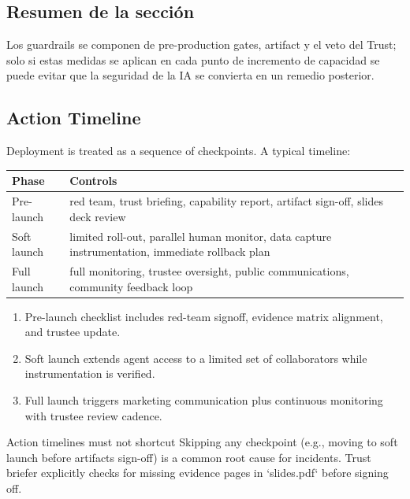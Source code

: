 \subsection{Resumen de la sección}

Los guardrails se componen de pre-production gates, artifact y el veto del Trust; solo si estas medidas se aplican en cada punto de incremento de capacidad se puede evitar que la seguridad de la IA se convierta en un remedio posterior.

\subsection{Action Timeline}

Deployment is treated as a sequence of checkpoints. A typical timeline:

\begin{tabular}{p{}p{}}
\toprule
Phase & Controls \\
\midrule
Pre-launch & red team, trust briefing, capability report, artifact sign-off, slides deck review \\
Soft launch & limited roll-out, parallel human monitor, data capture instrumentation, immediate rollback plan \\
Full launch & full monitoring, trustee oversight, public communications, community feedback loop \\
\bottomrule
\end{tabular}

\begin{enumerate}
    \item Pre-launch checklist includes red-team signoff, evidence matrix alignment, and trustee update.
    \item Soft launch extends agent access to a limited set of collaborators while instrumentation is verified.
    \item Full launch triggers marketing communication plus continuous monitoring with trustee review cadence.
\end{enumerate}

\begin{warningbox}{Action timelines must not shortcut}
Skipping any checkpoint (e.g., moving to soft launch before artifacts sign-off) is a common root cause for incidents. Trust briefer explicitly checks for missing evidence pages in `slides.pdf` before signing off.
\end{warningbox}

